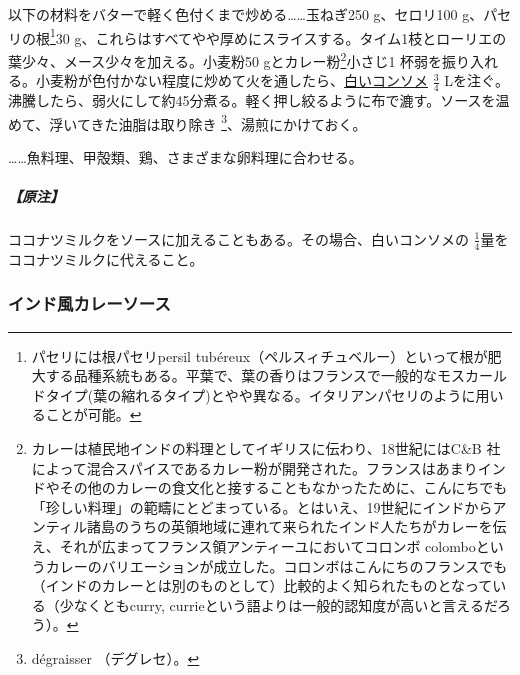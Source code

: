 \begin{recette}

 

以下の材料をバターで軽く色付くまで炒める\ldots{}\ldots{}玉ねぎ250
g、セロリ100 g、パセリの根\footnote{パセリには根パセリpersil
  tubéreux（ペルスィチュベルー）といって根が肥大する品種系統もある。平葉で、葉の香りはフランスで一般的なモスカールドタイプ(葉の縮れるタイプ)とやや異なる。イタリアンパセリのように用いることが可能。}30
g、これらはすべてやや厚めにスライスする。タイム1枝とローリエの葉少々、メース少々を加える。小麦粉50
gとカレー粉\footnote{カレーは植民地インドの料理としてイギリスに伝わり、18世紀にはC\&B
  社によって混合スパイスであるカレー粉が開発された。フランスはあまりインドやその他のカレーの食文化と接することもなかったために、こんにちでも「珍しい料理」の範疇にとどまっている。とはいえ、19世紀にインドからアンティル諸島のうちの英領地域に連れて来られたインド人たちがカレーを伝え、それが広まってフランス領アンティーユにおいてコロンボ
  colomboというカレーのバリエーションが成立した。コロンボはこんにちのフランスでも（インドのカレーとは別のものとして）比較的よく知られたものとなっている（少なくともcurry,
  currieという語よりは一般的認知度が高いと言えるだろう）。}小さじ1
杯弱を振り入れる。小麦粉が色付かない程度に炒めて火を通したら、\protect\hyperlink{}{白いコンソメ}
\(\frac{3}{4}\)
Lを注ぐ。沸騰したら、弱火にして約45分煮る。軽く押し絞るように布で漉す。ソースを温めて、浮いてきた油脂は取り除き
\footnote{dégraisser （デグレセ）。}、湯煎にかけておく。

\ldots{}\ldots{}魚料理、甲殻類、鶏、さまざまな卵料理に合わせる。

\hypertarget{nota-sauce-currie}{%
\subparagraph{【原注】}\label{nota-sauce-currie}}

ココナツミルクをソースに加えることもある。その場合、白いコンソメの
\(\frac{1}{4}\)量をココナツミルクに代えること。

\atoaki{}

\hypertarget{sauce-currie-indienne}{%
\subsubsection{インド風カレーソース}\label{sauce-currie-indienne}}




\end{recette}
